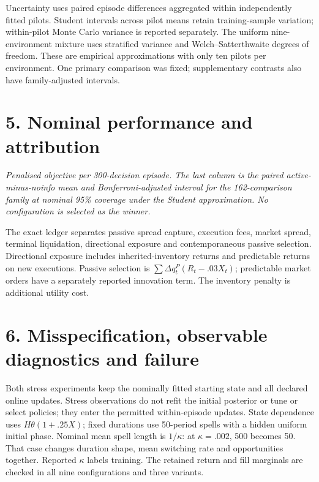 \documentclass[11pt,a4paper]{article}
\begin{document}
Uncertainty uses paired episode differences aggregated within independently fitted
pilots. Student intervals across pilot means retain training-sample variation;
within-pilot Monte Carlo variance is reported separately. The uniform nine-environment
mixture uses stratified variance and Welch--Satterthwaite degrees of freedom. These
are empirical approximations with only ten pilots per environment. One primary
comparison was fixed; supplementary contrasts also have family-adjusted intervals.

\newpage
\section*{5. Nominal performance and attribution}


\textit{Penalised objective per 300-decision episode. The last column is the paired
active-minus-noinfo mean and Bonferroni-adjusted interval for the 162-comparison
family at nominal 95\% coverage under the Student approximation. No configuration is selected as the winner.}



The exact ledger separates passive spread capture, execution fees, market spread,
terminal liquidation, directional exposure and contemporaneous passive selection.
Directional exposure includes inherited-inventory returns and predictable
returns on new executions. Passive selection is
$\sum\Delta q_t^{P}(R_t-.03X_t)$; predictable market orders have a separately
reported innovation term. The inventory penalty is additional utility cost.


\newpage
\section*{6. Misspecification, observable diagnostics and failure}
Both stress experiments keep the nominally fitted starting state and all declared
online updates. Stress observations do not refit the initial posterior or tune or
select policies; they enter the permitted within-episode updates.
State dependence uses $H\theta(1+.25X)$; fixed durations use 50-period spells
with a hidden uniform initial phase. Nominal mean spell length is $1/\kappa$:
at $\kappa=.002$, 500 becomes 50. That case changes duration shape, mean switching
rate and opportunities together. Reported $\kappa$ labels training. The retained
return and fill marginals are checked in all nine configurations and three variants.
\end{document}
